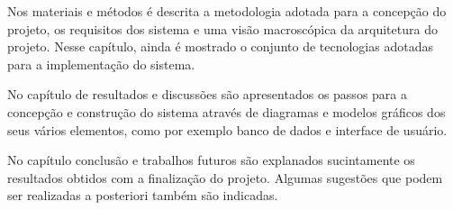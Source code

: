 Nos materiais e métodos é descrita a metodologia adotada para a concepção do projeto, os requisitos dos sistema e uma visão macroscópica da arquitetura do projeto. Nesse capítulo, ainda é mostrado o conjunto de tecnologias adotadas para a implementação do sistema.    

No capítulo de resultados e discussões são apresentados os passos para a concepção e construção do sistema através de diagramas e modelos gráficos dos seus vários elementos, como por exemplo banco de dados e interface de usuário.

No capítulo conclusão e trabalhos futuros são explanados sucintamente os resultados obtidos com a finalização do projeto. Algumas sugestões que podem ser realizadas a posteriori também são indicadas.
